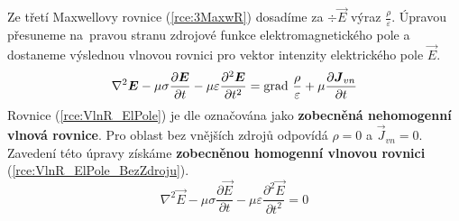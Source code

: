 Ze třetí Maxwellovy rovnice (\ref{rce:3MaxwR}) dosadíme za $\div\vec E$ výraz $\frac{\rho}{\varepsilon}$. Úpravou přesuneme na~pravou stranu zdrojové funkce elektromagnetického pole a dostaneme výslednou vlnovou rovnici pro vektor intenzity elektrického pole $\vec E$.
\begin{equation}
	\nabla^{2}\mbox{\boldmath$E$} -\mu\sigma\frac{\partial\mbox{\boldmath$E$}}{\partial t}-\mu\varepsilon\frac{\partial^{2}\mbox{\boldmath$E$}}{\partial t^{2}} = \mathrm{grad}\ \frac{\rho}{\varepsilon}+\mu\frac{\partial\mbox{\boldmath$J$}_{vn}}{\partial t}
	\label{rce:VlnR_ElPole}
\end{equation}
Rovnice (\ref{rce:VlnR_ElPole}) je dle \cite{emp} označována jako {\bf zobecněná nehomogenní vlnová rovnice}. Pro oblast bez vnějších zdrojů 
odpovídá $\rho = 0$ a $\vec J_{vn} = 0$. Zavedení této úpravy získáme {\bf zobecněnou homogenní vlnovou rovnici} (\ref{rce:VlnR_ElPole_BezZdroju}).
\begin{equation}
	\nabla^{2}\vec E -\mu\sigma\frac{\partial\vec E}{\partial t}-\mu\varepsilon\frac{\partial^{2}\vec E}{\partial t^{2}} = 0
	\label{rce:VlnR_ElPole_BezZdroju}
\end{equation}

